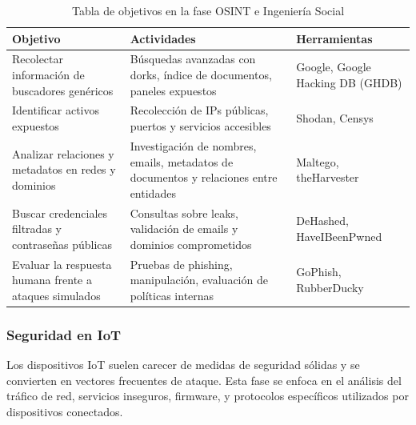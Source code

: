 \documentclass[a4paper, 11pt]{article}
\begin{document}
\begin{table}[H]
\centering
\renewcommand{\arraystretch}{1.4}
\begin{tabular}{|p{4.3cm}|p{6.5cm}|p{4.3cm}|}
\hline
\textbf{Objetivo} & \textbf{Actividades} & \textbf{Herramientas} \\
\hline
Recolectar información de buscadores genéricos & Búsquedas avanzadas con dorks, índice de documentos, paneles expuestos & Google, Google Hacking DB (GHDB) \\
\hline
Identificar activos expuestos & Recolección de IPs públicas, puertos y servicios accesibles & Shodan, Censys \\
\hline
Analizar relaciones y metadatos en redes y dominios & Investigación de nombres, emails, metadatos de documentos y relaciones entre entidades & Maltego, theHarvester \\
\hline
Buscar credenciales filtradas y contraseñas públicas & Consultas sobre leaks, validación de emails y dominios comprometidos & DeHashed, HaveIBeenPwned \\
\hline
Evaluar la respuesta humana frente a ataques simulados & Pruebas de phishing, manipulación, evaluación de políticas internas & GoPhish, RubberDucky \\
\hline
\end{tabular}
\caption{Tabla de objetivos en la fase OSINT e Ingeniería Social}
\end{table}









\subsubsection{Seguridad en IoT}

Los dispositivos IoT suelen carecer de medidas de seguridad sólidas y se convierten en vectores frecuentes de ataque. Esta fase se enfoca en el análisis del tráfico de red, servicios inseguros, firmware, y protocolos específicos utilizados por dispositivos conectados.
\end{document}

